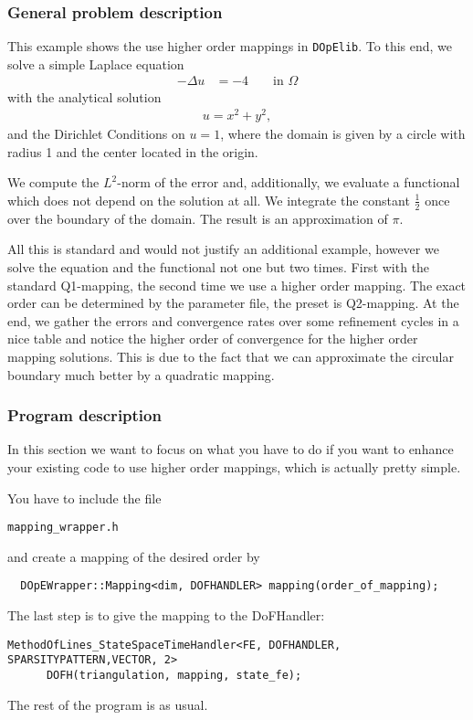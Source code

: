 \subsubsection{General problem description}
This example shows the use higher order mappings in \texttt{DOpElib}. To this end, we solve a simple Laplace equation
\begin{align*}
-\Delta u &= -4 && \text{ in } \Omega
\end{align*}
with the analytical solution
\begin{align*}
u = {x^2 + y^2},
\end{align*}
and the Dirichlet Conditions on $u=1$, where the domain is given by a circle with radius 1 and the center located in the origin.

We compute the $L^2$-norm of the error and, additionally, we evaluate a functional which does not depend on the solution at all.
We integrate the constant $\frac 12$ once over the boundary of the domain. The result is an approximation of $\pi$.

All this is standard and would not justify an additional example, however we solve the equation and the functional not one but two
times. First with the standard Q1-mapping, the second time we use a higher order mapping. The exact order can be determined by the 
parameter file, the preset is Q2-mapping. At the end, we gather the errors and convergence rates over some refinement cycles
in a nice table and notice the higher order of convergence for the higher order mapping solutions. This is due to the fact that
we can approximate the circular boundary much better by a quadratic mapping.
\subsubsection{Program description}
In this section we want to focus on what you have to do if you want to enhance your existing code to use higher order mappings,
which is actually pretty simple.

You have to include the file
\begin{verbatim}
mapping_wrapper.h
\end{verbatim}

and create a mapping of the desired order by
\begin{verbatim}
  DOpEWrapper::Mapping<dim, DOFHANDLER> mapping(order_of_mapping);
\end{verbatim}

The last step is to give the mapping to the DoFHandler:
\begin{verbatim}
MethodOfLines_StateSpaceTimeHandler<FE, DOFHANDLER, SPARSITYPATTERN,VECTOR, 2> 
	  DOFH(triangulation, mapping, state_fe);
\end{verbatim}
The rest of the program is as usual.
